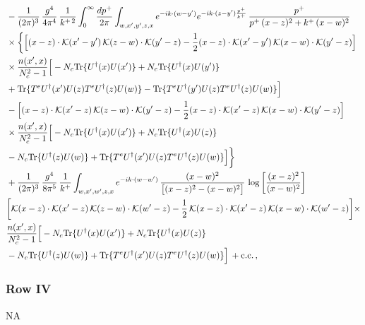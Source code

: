 \documentclass[9pt]{article}
\numberwithin{equation}{section}
\begin{document}
\begin{align}
&-\frac{1}{(2\pi)^{3}}\,\frac{g^{4}}{4\pi^{4}}\,\frac{1}{k^{+\,2}}\int_{0}^{\infty}\frac{dp^{+}}{2\pi}\int_{w,x',y',z,x}e^{-ik\cdot(w-y')}e^{-ik\cdot(z-y')\frac{p^{+}}{k^{+}}}\,\frac{p^{+}}{p^{+}\,(x-z)^{2}+k^{+}\,(x-w)^{2}}\notag\\
&\times\bigg\{\Big[(x-z)\cdot\mathcal{K}(x'-y')\,\mathcal{K}(z-w)\cdot\mathcal{K}(y'-z)-\frac{1}{2}(x-z)\cdot\mathcal{K}(x'-y')\,\mathcal{K}(x-w)\cdot\mathcal{K}(y'-z)\Big]\notag\\
&\times\frac{n(x',x)}{N_{c}^{2}-1}\Big[-N_{c}{\rm Tr}\{U^{\dagger}(x)U(x')\}+N_{c}{\rm Tr}\{U^{\dagger}(x)U(y')\}\notag\\ &+{\rm Tr}\{T^{e}U^{\dagger}(x')U(z)T^{e}U^{\dagger}(z)U(w)\}-{\rm Tr}\{T^{e}U^{\dagger}(y')U(z)T^{e}U^{\dagger}(z)U(w)\}\Big]\notag\\
&-\Big[(x-z)\cdot\mathcal{K}(x'-z)\,\mathcal{K}(z-w)\cdot\mathcal{K}(y'-z)-\frac{1}{2}(x-z)\cdot\mathcal{K}(x'-z)\,\mathcal{K}(x-w)\cdot\mathcal{K}(y'-z)\Big]\notag\\
&\times\frac{n(x',x)}{N_{c}^{2}-1}\Big[-N_{c}{\rm Tr}\{U^{\dagger}(x)U(x')\}+N_{c}{\rm Tr}\{U^{\dagger}(x)U(z)\}\notag\\ &-N_{c}{\rm Tr}\{U^{\dagger}(z)U(w)\}+{\rm Tr}\{T^{e}U^{\dagger}(x')U(z)T^{e}U^{\dagger}(z)U(w)\}\Big]\bigg\}\notag\\
& +\frac{1}{(2\pi)^{3}}\,\frac{g^{4}}{8\pi^{5}}\,\frac{1}{k^{+}}\int_{w,x',w',z,x}e^{-ik\cdot(w-w')}\,\frac{(x-w)^{2}}{\big[(x-z)^{2}-(x-w)^{2}\big]}\,\log\left[\frac{(x-z)^{2}}{(x-w)^{2}}\right]\notag \\ &  \bigg[\mathcal{K}(x-z)\cdot\mathcal{K}(x'-z)\,\mathcal{K}(z-w)\cdot\mathcal{K}(w'-z)-\frac{1}{2}\,\mathcal{K}(x-z)\cdot\mathcal{K}(x'-z)\,\mathcal{K}(x-w)\cdot\mathcal{K}(w'-z)\bigg]   \times\notag \\ & \frac{n(x',x)}{N_{c}^{2}-1}\Big[-N_{c}{\rm Tr}\{U^{\dagger}(x)U(x')\}+N_{c}{\rm Tr}\{U^{\dagger}(x)U(z)\}\notag\\ &-N_{c}{\rm Tr}\{U^{\dagger}(z)U(w)\}+{\rm Tr}\{T^{e}U^{\dagger}(x')U(z)T^{e}U^{\dagger}(z)U(w)\}\Big]\,+{\rm c.c.}\,,\label{eq:E-III.III-2o}
\end{align}
\subsubsection*{Row IV}
\textsc{NA}
\end{document}
